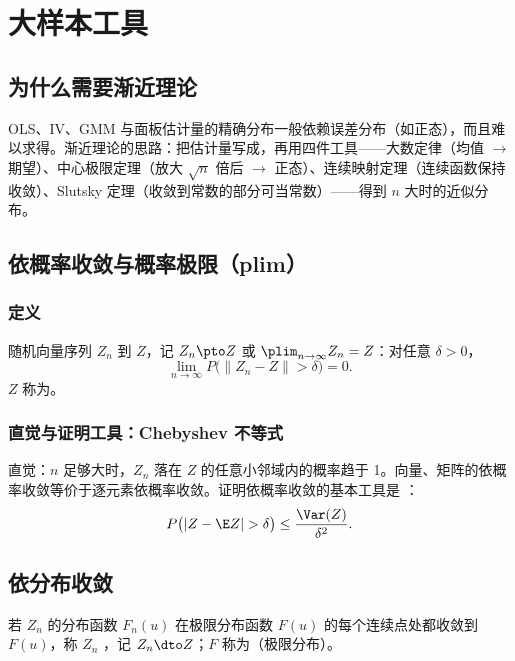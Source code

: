 \section{大样本工具}\label{sec:U01b-asy}

\subsection{为什么需要渐近理论}

OLS、IV、GMM 与面板估计量的精确分布一般依赖误差分布（如正态），而且难以求得。渐近理论的思路：把估计量写成，再用四件工具——大数定律（均值 $\to$ 期望）、中心极限定理（放大 $\sqrt n$ 倍后 $\to$ 正态）、连续映射定理（连续函数保持收敛）、Slutsky 定理（收敛到常数的部分可当常数）——得到 $n$ 大时的近似分布。

\subsection{依概率收敛与概率极限（plim）}

\subsubsection{定义}

\begin{defn}\label{def:U01b-pconv}
随机向量序列 $Z_n$ 到 $Z$，记 $Z_n\pto Z$ 或 $\plim_{n\to\infty}Z_n=Z$：对任意 $\delta>0$，
\[
\lim_{n\to\infty}P\big(\|Z_n-Z\|>\delta\big)=0 .
\]
$Z$ 称为。
\end{defn}

\subsubsection{直觉与证明工具：Chebyshev 不等式}

直觉：$n$ 足够大时，$Z_n$ 落在 $Z$ 的任意小邻域内的概率趋于 1。向量、矩阵的依概率收敛等价于逐元素依概率收敛。证明依概率收敛的基本工具是 ：
\[
P\big(|Z-\E Z|>\delta\big)\le\frac{\Var(Z)}{\delta^2}.
\]

\subsection{依分布收敛}

\begin{defn}\label{def:U01b-dconv}
若 $Z_n$ 的分布函数 $F_n(u)$ 在极限分布函数 $F(u)$ 的每个连续点处都收敛到 $F(u)$，称 $Z_n$ ，记 $Z_n\dto Z$；$F$ 称为（极限分布）。
\end{defn}

